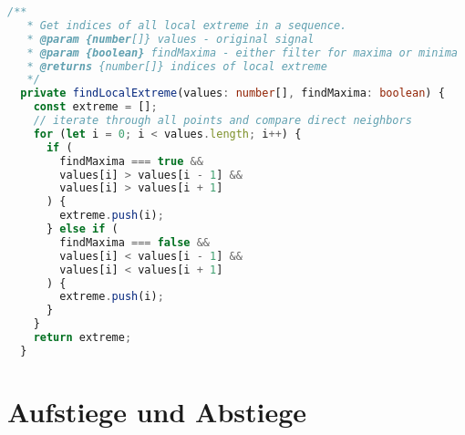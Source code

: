 \begin{lstlisting}[language=Typescript]
 /**
   * Get indices of all local extreme in a sequence.
   * @param {number[]} values - original signal
   * @param {boolean} findMaxima - either filter for maxima or minima
   * @returns {number[]} indices of local extreme
   */
  private findLocalExtreme(values: number[], findMaxima: boolean) {
    const extreme = [];
    // iterate through all points and compare direct neighbors
    for (let i = 0; i < values.length; i++) {
      if (
        findMaxima === true &&
        values[i] > values[i - 1] &&
        values[i] > values[i + 1]
      ) {
        extreme.push(i);
      } else if (
        findMaxima === false &&
        values[i] < values[i - 1] &&
        values[i] < values[i + 1]
      ) {
        extreme.push(i);
      }
    }
    return extreme;
  }
\end{lstlisting}
\section{Aufstiege und Abstiege}\label{appendix:trend-detection-code:aufstiege}
